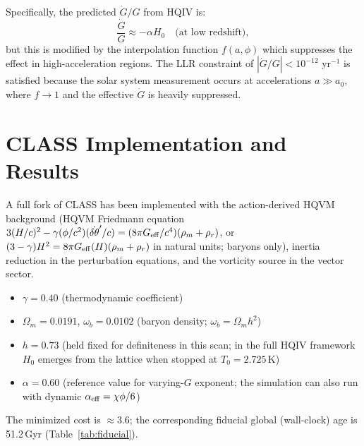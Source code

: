 \documentclass[12pt,a4paper]{article}
\begin{document}
Specifically, the predicted $\dot{G}/G$ from HQIV is:
\[
\frac{\dot{G}}{G} \approx -\alpha H_0 \quad \text{(at low redshift)},
\]
but this is modified by the interpolation function $f(a,\phi)$ which suppresses the effect in high-acceleration regions. The LLR constraint of $|\dot{G}/G| < 10^{-12}$ yr$^{-1}$ is satisfied because the solar system measurement occurs at accelerations $a \gg a_0$, where $f \to 1$ and the effective $\dot{G}$ is heavily suppressed.

\section{CLASS Implementation and Results}

A full fork of CLASS has been implemented with the action-derived HQVM background (HQVM Friedmann equation \(3(H/c)^2 - \gamma(\phi/c^2)(\dot{\delta\theta}'/c) = (8\pi G_{\rm eff}/c^4)(\rho_m + \rho_r)\), or \((3-\gamma)H^2 = 8\pi G_{\rm eff}(H)(\rho_m + \rho_r)\) in natural units; baryons only), inertia reduction in the perturbation equations, and the vorticity source in the vector sector.

\begin{itemize}
    \item $\gamma = 0.40$ (thermodynamic coefficient)
    \item $\Omega_m = 0.0191$, $\omega_b = 0.0102$ (baryon density; $\omega_b = \Omega_m h^2$)
    \item $h = 0.73$ (held fixed for definiteness in this scan; in the full HQIV framework $H_0$ emerges from the lattice when stopped at $T_0=2.725$\,K)
    \item $\alpha = 0.60$ (reference value for varying-$G$ exponent; the simulation can also run with dynamic $\alpha_{\rm eff} = \chi\phi/6$)
\end{itemize}

The minimized cost is $\approx 3.6$; the corresponding fiducial global (wall-clock) age is 51.2\,Gyr (Table~\ref{tab:fiducial}).
\end{document}
